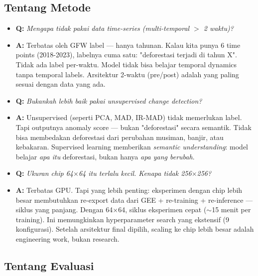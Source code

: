 \documentclass[10pt,a4paper,onecolumn]{article}
\begin{document}
\subsection{Tentang Metode}

\begin{itemize}
    \item{\textbf{Q:} \textit{Mengapa tidak pakai data time-series
          (multi-temporal $>$ 2 waktu)?}}
    \item{\textbf{A:} Terbatas oleh GFW label — hanya tahunan. Kalau
          kita punya 6 time points (2018-2023), labelnya cuma satu:
          "deforestasi terjadi di tahun X". Tidak ada label per-waktu.
          Model tidak bisa belajar temporal dynamics tanpa temporal
          labels. Arsitektur 2-waktu (pre/post) adalah yang paling
          sesuai dengan data yang ada.}
\end{itemize}

\begin{itemize}
    \item{\textbf{Q:} \textit{Bukankah lebih baik pakai unsupervised
          change detection?}}
    \item{\textbf{A:} Unsupervised (seperti PCA, MAD, IR-MAD) tidak
          memerlukan label. Tapi outputnya anomaly score — bukan
          "deforestasi" secara semantik. Tidak bisa membedakan
          deforestasi dari perubahan musiman, banjir, atau kebakaran.
          Supervised learning memberikan \textit{semantic
          understanding}: model belajar \textit{apa itu} deforestasi,
          bukan hanya \textit{apa yang berubah}.}
\end{itemize}

\begin{itemize}
    \item{\textbf{Q:} \textit{Ukuran chip 64$\times$64 itu terlalu
          kecil. Kenapa tidak 256$\times$256?}}
    \item{\textbf{A:} Terbatas GPU. Tapi yang lebih penting:
          eksperimen dengan chip lebih besar membutuhkan re-export
          data dari GEE + re-training + re-inference — siklus yang
          panjang. Dengan 64$\times$64, siklus eksperimen cepat
          ($\sim$15 menit per training). Ini memungkinkan hyperparameter
          search yang ekstensif (9 konfigurasi). Setelah arsitektur
          final dipilih, scaling ke chip lebih besar adalah engineering
          work, bukan research.}
\end{itemize}

\subsection{Tentang Evaluasi}
\end{document}
